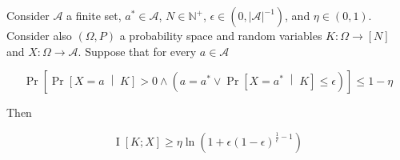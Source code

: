 \documentclass[anon,12pt]{colt2018} %
\newcommand{\AP}[1]{\left(#1\right)}
\newcommand{\AB}[1]{\left[#1\right]}
\newcommand{\ABM}[2]{\left[#1\;\middle\vert\;#2\right]}
\newcommand{\Pa}[2]{\underset{#1}{\operatorname{Pr}}\AB{#2}}
\newcommand{\CP}[3]{\underset{#1}{\operatorname{Pr}}\ABM{#2}{#3}}
\newcommand{\Ia}[2]{\underset{#1}{\operatorname{I}}\AB{#2}}
\newcommand{\Nats}{\mathbb{N}}
\newcommand{\Abs}[1]{\left\vert #1 \right\vert}
\newcommand{\A}{\mathcal{A}}
\begin{document}
\begin{samepage}
\begin{proposition}
\label{prp:delegation_information}

Consider $\A$ a finite set, $a^*\in\A$, $N \in \Nats^+$, $\epsilon \in \AP{0,{\Abs{\A}}^{-1}}$, and $\eta \in (0,1)$. Consider also $(\Omega,P)$ a probability space and random variables $K: \Omega \rightarrow [N]$ and $X: \Omega \rightarrow \A$. Suppose that for every $a \in \A$

\begin{equation}
\Pa{}{\CP{}{X=a}{K} > 0 \land \AP{a = a^* \lor \CP{}{X = a^*}{K} \leq \epsilon}} \leq 1 - \eta
\end{equation}

Then

\begin{equation}
\Ia{}{K;X} \geq \eta \ln\left(1 + \epsilon(1-\epsilon)^{\frac{1}{\epsilon}-1}\right)
\end{equation}

\end{proposition}
\end{samepage}
\end{document}
